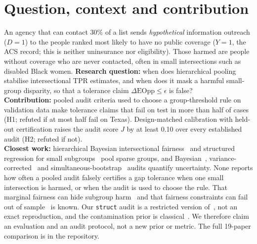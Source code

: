 \documentclass[11pt,a4paper]{article}
\begin{document}
\section{Question, context and contribution}
An agency that can contact 30\% of a list sends \emph{hypothetical} information outreach ($D=1$) to the people ranked
most likely to have no public coverage ($Y=1$, the ACS record; this is neither uninsurance nor eligibility). Those harmed
are people without coverage who are never contacted, often in small intersections such as disabled Black women.
\textbf{Research question:} when does hierarchical pooling stabilise intersectional TPR estimates, and when does it
mask a harmful small-group disparity, so that a tolerance claim $\Delta\text{EOpp}\le\epsilon$ is false?\\
\textbf{Contribution:} pooled audit criteria used to choose a group-threshold rule on validation data make tolerance
claims that fail on test in more than half of cases (H1; refuted if at most half fail on Texas). Design-matched
calibration with held-out certification raises the audit score $J$ by at least 0.10 over every established audit
(H2; refuted if not).\\
\textbf{Closest work:} hierarchical Bayesian intersectional fairness~\cite{foulds2020bayes} and structured regression
for small subgroups~\cite{herlihy2024} pool sparse groups, and Bayesian~\cite{ji2020}, variance-corrected~\cite{lum2022}
and simultaneous-bootstrap~\cite{cherian2024} audits quantify uncertainty. None reports how often a pooled audit falsely
certifies a gap tolerance when one small intersection is harmed, or when the audit is used to choose the rule. That
marginal fairness can hide subgroup harm~\cite{kearns2018} and that fairness constraints can fail out of
sample~\cite{cotter2019} is known. Our \texttt{struct} audit is a restricted version of~\cite{foulds2020bayes}, not an
exact reproduction, and the contamination prior is classical~\cite{berger1986}. We therefore claim an evaluation and an
audit protocol, not a new prior or metric. The full 19-paper comparison is in the repository.
\end{document}
